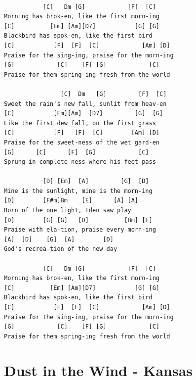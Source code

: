 \documentclass[]{book}
\let\stdsection\section
\renewcommand\section{\clearpage\stdsection}
\begin{document}
\begin{verbatim}

           [C]   Dm [G]            [F]  [C]
Morning has brok-en, like the first morn-ing
[C]          [Em] [Am][D7]           [G] [G]
Blackbird has spok-en, like the first bird
[C]           [F]  [F]  [C]            [Am] [D]
Praise for the sing-ing, praise for the morn-ing
[G]            [C]    [F] [G]            [C]
Praise for them spring-ing fresh from the world

                [C]  Dm   [G]         [F]  [C]
Sweet the rain's new fall, sunlit from heav-en
[C]           [Em][Am]  [D7]         [G]  [G]
Like the first dew fall, on the first grass
[C]           [F]   [F]  [C]        [Am] [D]
Praise for the sweet-ness of the wet gard-en
[G]      [C]      [F]  [G]            [C]
Sprung in complete-ness where his feet pass

           [D] [Em]  [A]         [G]  [D]
Mine is the sunlight, mine is the morn-ing
[D]        [F#m]Bm    [E]      [A] [A]
Born of the one light, Eden saw play
[D]        [G] [G]   [D]          [Bm] [E]
Praise with ela-tion, praise every morn-ing
[A]  [D]    [G]  [A]        [D]
God's recrea-tion of the new day

           [C]   Dm [G]            [F]  [C]
Morning has brok-en, like the first morn-ing
[C]          [Em] [Am][D7]           [G] [G]
Blackbird has spok-en, like the first bird
[C]           [F]  [F]  [C]            [Am] [D]
Praise for the sing-ing, praise for the morn-ing
[G]            [C]    [F] [G]            [C]
Praise for them spring-ing fresh from the world
\end{verbatim}

\hypertarget{dust-in-the-wind---kansas}{%
\section{Dust in the Wind - Kansas}\label{dust-in-the-wind---kansas}}
\end{document}
